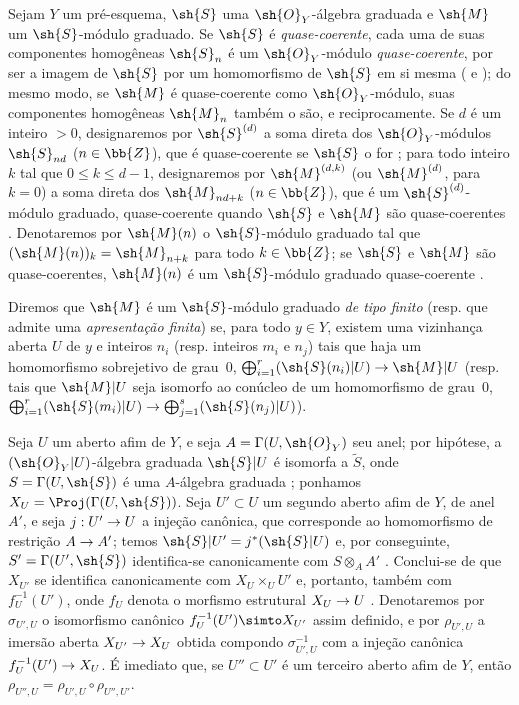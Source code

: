 \documentclass[oneside,10pt]{amsart}
\makeatletter
\renewcommand{\leq}{\leqslant}
\newcommand{\ega@arrow}[2]{\mathchoice{#1}{#2}{#2}{#2}}
\renewcommand{\to}{\ega@arrow{\longrightarrow}{\rightarrow}}
\newcommand{\oldpage}[2][]{\marginnote{\normalfont\footnotesize\textbf{#1}~|~#2}\ignorespaces}
\let\EGAOriginalLabel\label
\renewcommand{\label}[1]{\phantomsection\EGAOriginalLabel{#1}}
\makeatother
\begin{document}
\begin{env}[3.1.1]
\label{II.3.1.1}
Sejam $Y$ um pré-esquema, $\sh{S}$ uma $\sh{O}_Y$-álgebra graduada e $\sh{M}$ um $\sh{S}$-módulo graduado.
Se $\sh{S}$ é \emph{quase-coerente}, cada uma de suas componentes homogêneas $\sh{S}_n$ é um $\sh{O}_Y$-módulo \emph{quase-coerente}, por ser a imagem de $\sh{S}$ por um homomorfismo de $\sh{S}$ em si mesma ( e );
do mesmo modo, se $\sh{M}$ é quase-coerente como $\sh{O}_Y$-módulo, suas componentes homogêneas $\sh{M}_n$ também o são, e reciprocamente.
Se $d$ é um inteiro $>0$, designaremos por $\sh{S}^{(d)}$ a soma direta dos $\sh{O}_Y$-módulos $\sh{S}_{nd}$ ($n\in\bb{Z}$), que é quase-coerente se $\sh{S}$ o for ;
para todo inteiro $k$ tal que $0\leq k\leq d-1$, designaremos por $\sh{M}^{(d,k)}$ (ou $\sh{M}^{(d)}$, para $k=0$) a soma direta dos $\sh{M}_{nd+k}$ ($n\in\bb{Z}$), que é um $\sh{S}^{(d)}$-módulo graduado, quase-coerente quando $\sh{S}$ e $\sh{M}$ são quase-coerentes .
Denotaremos por $\sh{M}(n)$ o $\sh{S}$-módulo graduado tal que $(\sh{M}(n))_k=\sh{M}_{n+k}$ para todo $k\in\bb{Z}$;
se $\sh{S}$ e $\sh{M}$ são quase-coerentes, $\sh{M}(n)$ é um $\sh{S}$-módulo graduado quase-coerente .

Diremos que $\sh{M}$ é um $\sh{S}$-módulo graduado \emph{de tipo finito} (resp. que admite uma \emph{apresentação finita}) se, para todo $y\in Y$, existem uma vizinhança aberta $U$ de $y$ e inteiros $n_i$ (resp. inteiros $m_i$ e $n_j$) tais que haja um homomorfismo sobrejetivo de grau~$0$, $\bigoplus_{i=1}^r(\sh{S}(n_i)|U)\to\sh{M}|U$ (resp. tais que $\sh{M}|U$ seja isomorfo ao conúcleo de um homomorfismo de grau~$0$, $\bigoplus_{i=1}^r(\sh{S}(m_i)|U)\to\bigoplus_{j=1}^s(\sh{S}(n_j)|U)$).

Seja $U$ um aberto afim de $Y$, e seja $A=\Gamma(U,\sh{O}_Y)$ seu anel;
por hipótese, a $(\sh{O}_Y|U)$-álgebra graduada $\sh{S}|U$ é isomorfa a $\widetilde{S}$, onde $S=\Gamma(U,\sh{S})$ é uma $A$-álgebra
\oldpage[II]{50}
graduada ;
ponhamos $X_U=\Proj(\Gamma(U,\sh{S}))$.
Seja $U'\subset U$ um segundo aberto afim de $Y$, de anel $A'$, e seja $j:U'\to U$ a injeção canônica, que corresponde ao homomorfismo de restrição $A\to A'$;
temos $\sh{S}|U'=j^*(\sh{S}|U)$ e, por conseguinte, $S'=\Gamma(U',\sh{S})$ identifica-se canonicamente com $S\otimes_AA'$ .
Conclui-se de  que $X_{U'}$ se identifica canonicamente com $X_U\times_U U'$ e, portanto, também com $f_U^{-1}(U')$, onde $f_U$ denota o morfismo estrutural $X_U\to U$ .
Denotaremos por $\sigma_{U',U}$ o isomorfismo canônico $f_U^{-1}(U')\simto X_{U'}$ assim definido, e por $\rho_{U',U}$ a imersão aberta $X_{U'}\to X_U$ obtida compondo $\sigma_{U',U}^{-1}$ com a injeção canônica $f_U^{-1}(U')\to X_U$.
É imediato que, se $U''\subset U'$ é um terceiro aberto afim de $Y$, então $\rho_{U'',U}=\rho_{U',U}\circ\rho_{U'',U'}$.
\end{env}
\end{document}
